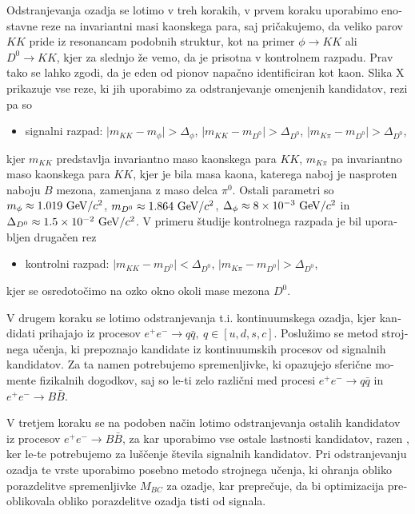 \begin{otherlanguage}{slovene}
Odstranjevanja ozadja se lotimo v treh korakih, v prvem koraku uporabimo enostavne reze na invariantni masi kaonskega para, saj pričakujemo, da veliko parov $KK$ pride iz resonancam podobnih struktur, kot na primer $\phi \to KK$ ali $D^0 \to KK$, kjer za slednjo že vemo, da je prisotna v kontrolnem razpadu. Prav tako se lahko zgodi, da je eden od pionov napačno identificiran kot kaon. Slika X prikazuje vse reze, ki jih uporabimo za odstranjevanje omenjenih kandidatov, rezi pa so
\begin{itemize}
\item signalni razpad: $\vert m_{KK} - m_{\phi} \vert > \Delta_\phi$, $\vert m_{KK} - m_{D^0} \vert > \Delta_{D^0}$, $\vert m_{K\pi} - m_{D^0} \vert > \Delta_{D^0}$,
\end{itemize}
kjer $m_{KK}$ predstavlja invariantno maso kaonskega para $KK$, $m_{K\pi}$ pa invariantno maso kaonskega para $KK$, kjer je bila masa kaona, katerega naboj je nasproten naboju $B$ mezona, zamenjana z maso delca $\pi^0$. Ostali parametri so $m_\phi \approx 1.019\mathrm{~GeV}/c^2$, $m_{D^0} \approx 1.864\mathrm{~GeV}/c^2$, $\Delta_\phi \approx 8\times 10^{-3}\mathrm{~GeV}/c^2$ in $\Delta_{D^0} \approx 1.5\times 10^{-2}\mathrm{~GeV}/c^2$. V primeru študije kontrolnega razpada je bil uporabljen drugačen rez
\begin{itemize}
\item kontrolni razpad: $\vert m_{KK} - m_{D^0} \vert < \Delta_{D^0}$, $\vert m_{K\pi} - m_{D^0} \vert > \Delta_{D^0}$,
\end{itemize}
kjer se osredotočimo na ozko okno okoli mase mezona $D^0$. 

V drugem koraku se lotimo odstranjevanja t.i. kontinuumskega ozadja, kjer kandidati prihajajo iz procesov $e^+e^- \to q \bar q,~q\in[u,d,s,c]$. Poslužimo se metod strojnega učenja, ki prepoznajo kandidate iz kontinuumskih procesov od signalnih kandidatov. Za ta namen potrebujemo spremenljivke, ki opazujejo sferične momente fizikalnih dogodkov, saj so le-ti zelo različni med procesi $e^+e^- \to q \bar q$ in $e^+e^- \to B \bar B$.

V tretjem koraku se na podoben način lotimo odstranjevanja ostalih kandidatov iz procesov $e^+e^- \to B \bar B$, za kar uporabimo vse ostale lastnosti kandidatov, razen \vars, ker le-te potrebujemo za luščenje števila signalnih kandidatov. Pri odstranjevanju ozadja te vrste uporabimo posebno metodo strojnega učenja, ki ohranja obliko porazdelitve spremenljivke $M_{BC}$ za ozadje, kar preprečuje, da bi optimizacija preoblikovala obliko porazdelitve ozadja tisti od signala.


\end{otherlanguage}
